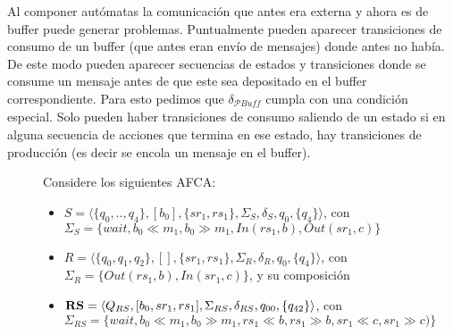 Al componer autómatas la comunicación que antes era externa y ahora es de buffer puede generar problemas. Puntualmente pueden aparecer transiciones de consumo de un buffer (que antes eran envío de mensajes) donde antes no había. De este modo pueden aparecer secuencias de estados y transiciones donde se consume un mensaje antes de que este sea depositado en el buffer correspondiente. Para esto pedimos que $\delta_\mathit{\mathcal{P}Buff}$ cumpla con una condición especial. Solo pueden haber transiciones de consumo saliendo de un estado si en alguna secuencia de acciones que termina en ese estado, hay transiciones de producción (es decir se encola un mensaje en el buffer).

\begin{figure}
\begin{example}
\label{ex:Composicion}
Considere los siguientes AFCA:
\begin{itemize}
    \item $S= \langle \{q_0,..,q_4\},[b_0],\{sr_1,rs_1\}, \Sigma_S, \delta_S, q_0, \{q_4\} \rangle$, con $\Sigma_S =\{wait, b_0 \ll m_1,b_0 \gg m_1, In(rs_1,b), Out(sr_1,c) \}$
    \item $R=\langle \{q_0,q_1,q_2\},[],\{sr_1,rs_1\}, \Sigma_R, \delta_R, q_0, \{q_4\} \rangle$, con $\Sigma_R = \{Out(rs_1,b), In(sr_1,c)\}$, y su composición
    \item $\mathbf{RS} =\langle Q_{RS}, [b_0, sr_1, rs_1], \Sigma_{RS}, \delta_{RS}, q_{00}, \{q_{42}\} \rangle$, con $\Sigma_{RS} =\{wait, b_0 \ll m_1,b_0 \gg m_1, rs_1 \ll b, rs_1 \gg b, sr_1 \ll c, sr_1 \gg c) \}$
\end{itemize} 


\end{example}
\end{figure}

